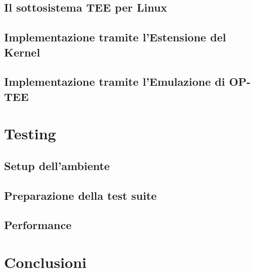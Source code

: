 \documentclass[12pt,italian]{report}
\begin{document}
\section{Il sottosistema TEE per Linux}
\label{sec:sottosistema-tee-per-linux}

\section{Implementazione tramite l'Estensione del Kernel}
\label{sec:implementazione-passthrough-tramite-kernel-module}

\section{Implementazione tramite l'Emulazione di OP-TEE}
\label{sec:implementazione-passthrough-tramite-bootloader}

\chapter{Testing}
\label{chap:testing}

\section{Setup dell'ambiente}
\label{sec:setup-ambiente}

\section{Preparazione della test suite}
\label{sec:preparazione-test-suite}

\section{Performance}
\label{sec:performance}

\chapter{Conclusioni}
\label{chap:conclusioni}
\end{document}
